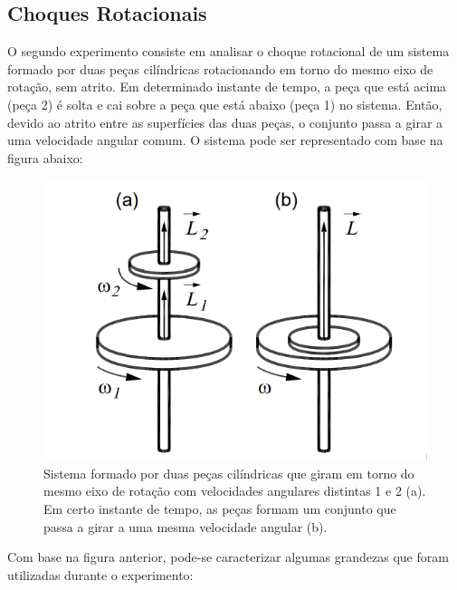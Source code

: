 \subsection{Choques Rotacionais}

O segundo experimento consiste em analisar o choque rotacional de um sistema formado por duas peças cilíndricas rotacionando em torno do mesmo eixo de rotação, sem atrito. Em determinado instante de tempo, a peça que está acima (peça 2) é solta e cai sobre a peça que está abaixo (peça 1) no sistema. Então, devido ao atrito entre as superfícies das duas peças, o conjunto passa a girar a uma velocidade angular comum. O sistema pode ser representado com base na figura abaixo:

\begin{figure}[H]
  \centering
  \includegraphics[scale=0.8]{images/choque_rotacional.png}
  \caption{Sistema formado por duas peças cilíndricas que giram em torno do mesmo eixo de rotação com velocidades angulares distintas 1 e 2 (a). Em certo instante de tempo, as peças formam um conjunto que passa a girar a uma mesma velocidade angular (b).}
\end{figure}

Com base na figura anterior, pode-se caracterizar algumas grandezas que foram utilizadas durante o experimento:

